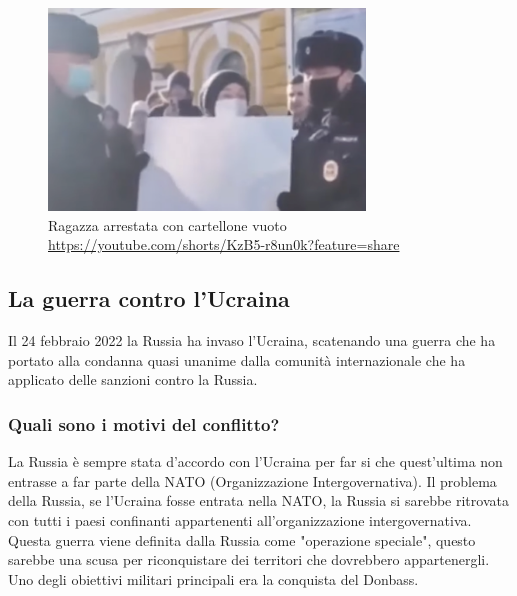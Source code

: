 \documentclass[a4paper, 12pt]{article}
\begin{document}
\begin{figure}[h]
    \centering
    \includegraphics[width=0.75\textwidth]{images/blank_billboard.png}
    \caption{Ragazza arrestata con cartellone vuoto\\\hspace{\textwidth}\href{https://youtube.com/shorts/KzB5-r8un0k?feature=share}{https://youtube.com/shorts/KzB5-r8un0k?feature=share}}
\end{figure}





\pagebreak

\subsection{La guerra contro l'Ucraina}

Il 24 febbraio 2022 la Russia ha invaso l'Ucraina, scatenando una guerra che ha portato alla condanna quasi unanime dalla comunità internazionale che ha applicato delle sanzioni contro la Russia.

\subsubsection{Quali sono i motivi del conflitto?}

La Russia è sempre stata d'accordo con l'Ucraina per far si che quest'ultima non entrasse a far parte della NATO (Organizzazione Intergovernativa). Il problema della Russia, se l'Ucraina fosse entrata nella NATO, la Russia si sarebbe ritrovata con tutti i paesi confinanti appartenenti all'organizzazione intergovernativa. Questa guerra viene definita dalla Russia come "operazione speciale", questo sarebbe una scusa per riconquistare dei territori che dovrebbero appartenergli. Uno degli obiettivi militari principali era la conquista del Donbass.
\end{document}
